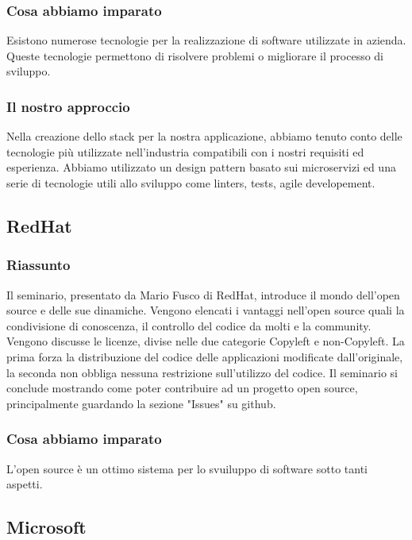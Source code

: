 \documentclass{report}
\begin{document}
\subsubsection*{Cosa abbiamo imparato}

Esistono numerose tecnologie per la realizzazione di software utilizzate in azienda. Queste tecnologie permettono di risolvere problemi o migliorare il processo di sviluppo. 

\subsubsection*{Il nostro approccio}

Nella creazione dello stack per la nostra applicazione, abbiamo tenuto conto delle tecnologie più utilizzate nell'industria compatibili con i nostri requisiti ed esperienza. Abbiamo utilizzato un design pattern basato sui microservizi ed una serie di tecnologie utili allo sviluppo come linters, tests, agile developement.

\subsection{RedHat}

\subsubsection*{Riassunto}
Il seminario, presentato da Mario Fusco di RedHat, introduce il mondo dell'open source e delle sue dinamiche. Vengono elencati i vantaggi nell'open source quali la condivisione di conoscenza, il controllo del codice da molti e la community. Vengono discusse le licenze, divise nelle due categorie Copyleft e non-Copyleft. La prima forza la distribuzione del codice delle applicazioni modificate dall'originale, la seconda non obbliga nessuna restrizione sull'utilizzo del codice. Il seminario si conclude mostrando come poter contribuire ad un progetto open source, principalmente guardando la sezione "Issues" su github.
\subsubsection*{Cosa abbiamo imparato}
L'open source è un ottimo sistema per lo svuiluppo di software sotto tanti aspetti.


\subsection{Microsoft}
\end{document}
